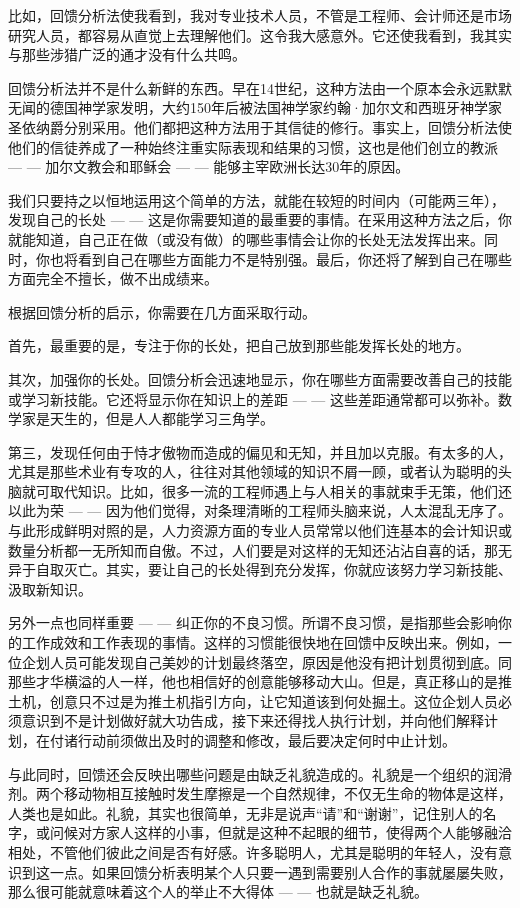 \documentclass[a4paper,12pt,lang=cn,fontset = windows]{elegantpaper} %
\begin{document}
比如，回馈分析法使我看到，我对专业技术人员，不管是工程师、会计师还是市场研究人员，都容易从直觉上去理解他们。这令我大感意外。它还使我看到，我其实与那些涉猎广泛的通才没有什么共鸣。

回馈分析法并不是什么新鲜的东西。早在14世纪，这种方法由一个原本会永远默默无闻的德国神学家发明，大约150年后被法国神学家约翰·加尔文和西班牙神学家圣依纳爵分别采用。他们都把这种方法用于其信徒的修行。事实上，回馈分析法使他们的信徒养成了一种始终注重实际表现和结果的习惯，这也是他们创立的教派 — — 加尔文教会和耶稣会 — — 能够主宰欧洲长达30年的原因。

我们只要持之以恒地运用这个简单的方法，就能在较短的时间内（可能两三年），发现自己的长处 — — 这是你需要知道的最重要的事情。在采用这种方法之后，你就能知道，自己正在做（或没有做）的哪些事情会让你的长处无法发挥出来。同时，你也将看到自己在哪些方面能力不是特别强。最后，你还将了解到自己在哪些方面完全不擅长，做不出成绩来。

根据回馈分析的启示，你需要在几方面采取行动。

首先，最重要的是，专注于你的长处，把自己放到那些能发挥长处的地方。

其次，加强你的长处。回馈分析会迅速地显示，你在哪些方面需要改善自己的技能或学习新技能。它还将显示你在知识上的差距 — — 这些差距通常都可以弥补。数学家是天生的，但是人人都能学习三角学。

第三，发现任何由于恃才傲物而造成的偏见和无知，并且加以克服。有太多的人，尤其是那些术业有专攻的人，往往对其他领域的知识不屑一顾，或者认为聪明的头脑就可取代知识。比如，很多一流的工程师遇上与人相关的事就束手无策，他们还以此为荣 — — 因为他们觉得，对条理清晰的工程师头脑来说，人太混乱无序了。与此形成鲜明对照的是，人力资源方面的专业人员常常以他们连基本的会计知识或数量分析都一无所知而自傲。不过，人们要是对这样的无知还沾沾自喜的话，那无异于自取灭亡。其实，要让自己的长处得到充分发挥，你就应该努力学习新技能、汲取新知识。

另外一点也同样重要 — — 纠正你的不良习惯。所谓不良习惯，是指那些会影响你的工作成效和工作表现的事情。这样的习惯能很快地在回馈中反映出来。例如，一位企划人员可能发现自己美妙的计划最终落空，原因是他没有把计划贯彻到底。同那些才华横溢的人一样，他也相信好的创意能够移动大山。但是，真正移山的是推土机，创意只不过是为推土机指引方向，让它知道该到何处掘土。这位企划人员必须意识到不是计划做好就大功告成，接下来还得找人执行计划，并向他们解释计划，在付诸行动前须做出及时的调整和修改，最后要决定何时中止计划。

与此同时，回馈还会反映出哪些问题是由缺乏礼貌造成的。礼貌是一个组织的润滑剂。两个移动物相互接触时发生摩擦是一个自然规律，不仅无生命的物体是这样，人类也是如此。礼貌，其实也很简单，无非是说声“请”和“谢谢”，记住别人的名字，或问候对方家人这样的小事，但就是这种不起眼的细节，使得两个人能够融洽相处，不管他们彼此之间是否有好感。许多聪明人，尤其是聪明的年轻人，没有意识到这一点。如果回馈分析表明某个人只要一遇到需要别人合作的事就屡屡失败，那么很可能就意味着这个人的举止不大得体 — — 也就是缺乏礼貌。
\end{document}
